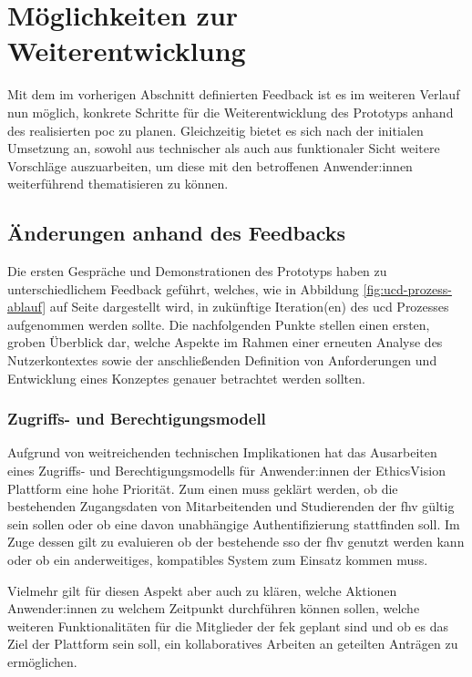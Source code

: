 \documentclass[a4paper,12pt,twoside]{scrreprt}
\begin{document}
\section{Möglichkeiten zur Weiterentwicklung}
\label{sec:möglichkeiten-weiterentwicklung}

Mit dem im vorherigen Abschnitt definierten Feedback ist es im weiteren Verlauf nun möglich, konkrete Schritte für die Weiterentwicklung des Prototyps anhand des realisierten \ac{poc} zu planen. Gleichzeitig bietet es sich nach der initialen Umsetzung an, sowohl aus technischer als auch aus funktionaler Sicht weitere Vorschläge auszuarbeiten, um diese mit den betroffenen Anwender:innen weiterführend thematisieren zu können.

\subsection{Änderungen anhand des Feedbacks}
\label{sub-sec:änderung-anhand-feedback}

Die ersten Gespräche und Demonstrationen des Prototyps haben zu unterschiedlichem Feedback geführt, welches, wie in Abbildung \ref{fig:ucd-prozess-ablauf} auf Seite \pageref{fig:ucd-prozess-ablauf} dargestellt wird, in zukünftige Iteration(en) des \acl{ucd} Prozesses aufgenommen werden sollte. Die nachfolgenden Punkte stellen einen ersten, groben Überblick dar, welche Aspekte im Rahmen einer erneuten Analyse des Nutzerkontextes sowie der anschließenden Definition von Anforderungen und Entwicklung eines Konzeptes genauer betrachtet werden sollten.

\subsubsection*{Zugriffs- und Berechtigungsmodell}
\label{sub-sub-sec:zugriffs-berechtigungsmodell}

Aufgrund von weitreichenden technischen Implikationen hat das Ausarbeiten eines Zugriffs- und Berechtigungsmodells für Anwender:innen der EthicsVision Plattform eine hohe Priorität. Zum einen muss geklärt werden, ob die bestehenden Zugangsdaten von Mitarbeitenden und Studierenden der \ac{fhv} gültig sein sollen oder ob eine davon unabhängige Authentifizierung stattfinden soll. Im Zuge dessen gilt zu evaluieren ob der bestehende \ac{sso} der \acl{fhv} genutzt werden kann oder ob ein anderweitiges, kompatibles System zum Einsatz kommen muss.

Vielmehr gilt für diesen Aspekt aber auch zu klären, welche Aktionen Anwender:innen zu welchem Zeitpunkt durchführen können sollen, welche weiteren Funktionalitäten für die Mitglieder der \acl{fek} geplant sind und ob es das Ziel der Plattform sein soll, ein kollaboratives Arbeiten an geteilten Anträgen zu ermöglichen.
\end{document}

